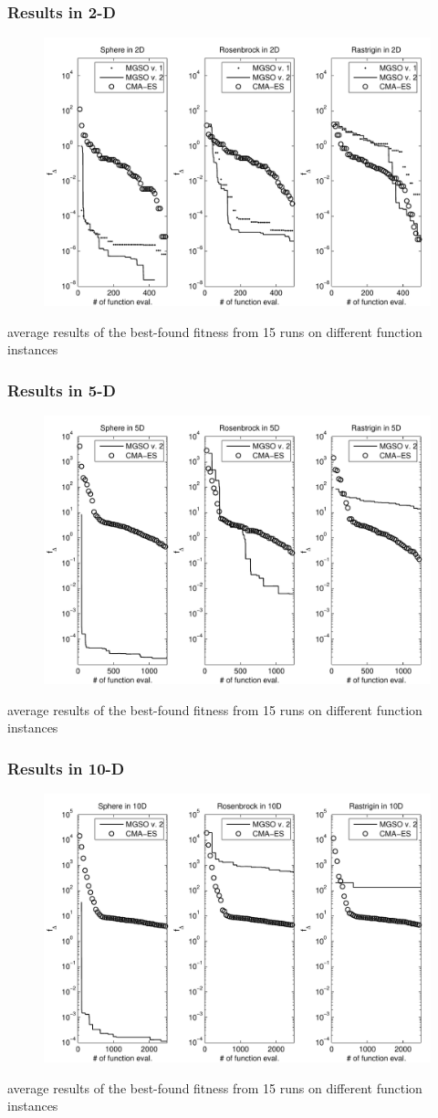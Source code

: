 \documentclass[sans,mathserif]{beamer}
\begin{document}
\begin{frame}
  \frametitle{Results in 2-D}
  \begin{figure}
  \includegraphics[width=0.7\linewidth]{img/optim_2D.pdf}
  \end{figure}
  {\small
    average results of the best-found fitness from 15 runs on different function instances }
\end{frame}

\begin{frame}
  \frametitle{Results in 5-D}
  \begin{figure}
  \includegraphics[width=0.7\linewidth]{img/optim_5D.pdf}
  \end{figure}
  {\small
    average results of the best-found fitness from 15 runs on different function instances }
\end{frame}

\begin{frame}
  \frametitle{Results in 10-D}
  \begin{figure}
  \includegraphics[width=0.7\linewidth]{img/optim_10D.pdf}
  \end{figure}
  {\small
    average results of the best-found fitness from 15 runs on different function instances }
\end{frame}
\end{document}
